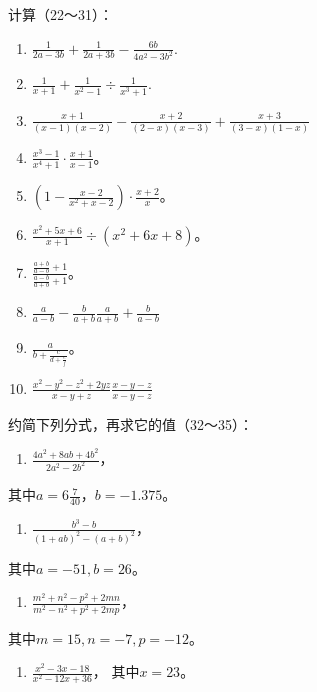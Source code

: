 计算（22～31）：

\begin{enumerate}[start=22]
\item
  \(\frac{1}{2a - 3b} +\frac{1}{2a + 3b} -\frac{6b}{4a^2 - 3b^2}.\)
\item
  \(\frac{1}{x + 1} +\frac{1}{x^2 - 1}\div \frac{1}{x^3 + 1}.\)
\item
  \(\frac{x + 1}{(x - 1)(x - 2)} -\frac{x + 2}{(2 - x)(x - 3)} +\frac{x + 3}{(3 - x)(1 - x)}\)
\item
  \(\frac{x^3 - 1}{x^4 + 1} \cdot \frac{x + 1}{x - 1}\)。
\item
  \(\left(1 - \frac{x - 2}{x^2 + x - 2}\right) \cdot \frac{x + 2}{x}\)。
\item
  \(\frac{x^2 + 5x + 6}{x + 1} \div (x^2 + 6x + 8)\)。
\item
  \(\frac{\frac{a + b}{a - b} + 1}{\frac{a - b}{a + b} + 1}\)。
\item
  \(\frac{a}{a - b} - \frac{b}{a + b}\)\(\frac{a}{a + b} + \frac{b}{a - b}\)
\item
  \(\frac{a}{b + \frac{c}{d + \frac{e}{f}}}\)。
\item
  \(\frac{x^2 - y^2 - z^2 + 2yz}{x - y + z}\)\(\frac{x - y - z}{x - y - z}\)
\end{enumerate}

约简下列分式，再求它的值（32～35）：

\begin{enumerate}[start=32]
\item
  \(\frac{4a^2 + 8ab + 4b^2}{2a^2 - 2b^2}\)，
\end{enumerate}
其中\(a = 6\frac{7}{40}\)，\(b = -1.375\)。

\begin{enumerate}[start=33]
\item
  \(\frac{b^3 - b}{(1 + ab)^2 - (a + b)^2}\)，
\end{enumerate}
其中\(a = -51, b = 26\)。

\begin{enumerate}[start=34]
\item
  \(\frac{m^2 + n^2 - p^2 + 2mn}{m^2 - n^2 + p^2 + 2mp}\)，
\end{enumerate}
其中\(m = 15, n = -7, p = -12\)。

\begin{enumerate}[start=35]
\item
  \(\frac{x^2 - 3x - 18}{x^2 - 12x + 36}\)， 其中\(x = 23\)。
\end{enumerate}


